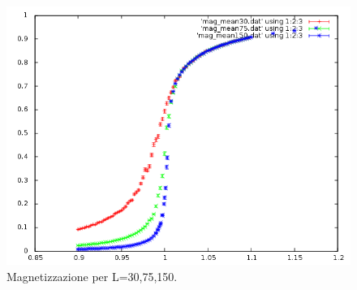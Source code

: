 \begin{figure}[h]
\centering
\includegraphics[scale=0.6]{potts/mag_taglia.png}
\caption{Magnetizzazione per L=30,75,150.}
\end{figure}
\newpage
\newpage
\clearpage
